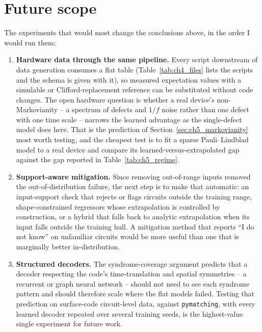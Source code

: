 \documentclass[Thesis.tex]{subfiles}
\begin{document}
\section{Future scope}

The experiments that would most change the conclusions above, in the order I would
run them:

\begin{enumerate}
    \item \textbf{Hardware data through the same pipeline.} Every script downstream
    of data generation consumes a flat table (Table~\ref{tab:ch4_files} lists the
    scripts and the schema is given with it), so measured expectation values with a simulable or Clifford-replacement
    reference can be substituted without code changes. The open hardware question is whether a
    real device's non-Markovianity -- a spectrum of defects and $1/f$ noise rather
    than one defect with one time scale -- narrows the learned advantage as the
    single-defect model does here. That is the prediction of
    Section~\ref{sec:ch5_markovianity} most worth testing, and the cheapest test is
    to fit a sparse Pauli--Lindblad model to a real device and compare its
    learned-versus-extrapolated gap against the gap reported in
    Table~\ref{tab:ch5_regime}.

    \item \textbf{Support-aware mitigation.} Since removing out-of-range inputs
    removed the out-of-distribution failure, the next step is to make that automatic:
    an input-support check that rejects or flags circuits outside the training
    range, shape-constrained regressors whose extrapolation is controlled by
    construction, or a hybrid that falls back to analytic extrapolation when its
    input falls outside the training hull. A mitigation method that reports ``I do not know'' on unfamiliar
    circuits would be more useful than one that is marginally better in-distribution.

    \item \textbf{Structured decoders.} The syndrome-coverage argument predicts that
    a decoder respecting the code's time-translation and spatial symmetries -- a
    recurrent or graph neural network -- should not need to see each syndrome pattern
    and should therefore scale where the flat models failed. Testing that prediction
    on surface-code circuit-level data, against \texttt{pymatching}, with every
    learned decoder repeated over several training seeds, is the highest-value
    single experiment for future work.


\end{enumerate}
\end{document}
